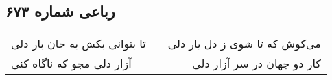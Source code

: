 \begin{center}
\section*{رباعی شماره ۶۷۳}
\label{sec:sh673}
\begin{longtable}{l p{0.5cm} r}
تا بتوانی بکش به جان بار دلی
&&
می‌کوش که تا شوی ز دل یار دلی
\\
آزار دلی مجو که ناگاه کنی
&&
کار دو جهان در سر آزار دلی
\\
\end{longtable}
\end{center}
